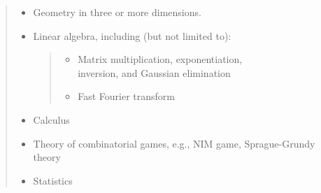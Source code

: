 \documentclass[a4paper,11pt,oneside]{article}
\newcommand{\xmark}{\ding{55}}%
\newcommand{\cexcl}{{\small\xmark}}
\newcommand{\Iexcluded}{\item[\hbox to 1.8em{\cexcl\hfill}]}
\newenvironment{myitemize}{\begin{quote}\begin{itemize}\itemsep 0pt}{\end{itemize}\end{quote}}
\begin{document}
    \begin{myitemize}
    \Iexcluded Geometry in three or more dimensions.
    \Iexcluded  Linear algebra, including (but not limited to):
        \begin{myitemize}
        \item Matrix multiplication, exponentiation, \\
              inversion, and Gaussian elimination
        \item Fast Fourier transform
        \end{myitemize}
    \Iexcluded Calculus
    \Iexcluded Theory of combinatorial games, e.g., NIM game, Sprague-Grundy theory
    \Iexcluded Statistics
    \end{myitemize}

\end{document}

